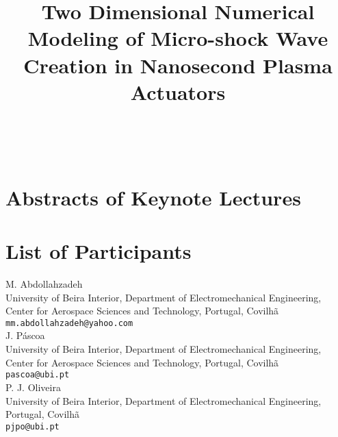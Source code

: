 \documentclass[article,A4,11pt]{llncs}%
\begin{document}
\newpage
{\ }

\tableofcontents

\part{Abstracts of Keynote Lectures}

\pagestyle{plain}
\part{List of Participants}
\title{Two Dimensional Numerical Modeling of Micro-shock Wave Creation in Nanosecond Plasma Actuators}
 \author{} \institute{}
\maketitle
\begin{center}
{\large M. Abdollahzadeh}\\
University of Beira Interior, Department of Electromechanical Engineering, Center for Aerospace Sciences and Technology, Portugal, Covilhã\\
{\tt mm.abdollahzadeh@yahoo.com}
\\ \vspace{4mm}
{\large J. Páscoa}\\
University of Beira Interior, Department of Electromechanical Engineering, Center for Aerospace Sciences and Technology, Portugal, Covilhã\\
{\tt pascoa@ubi.pt}
\\ \vspace{4mm}
{\large P. J. Oliveira}\\
University of Beira Interior, Department of Electromechanical Engineering, Portugal, Covilhã\\
{\tt pjpo@ubi.pt}
\end{center}
\end{document}
